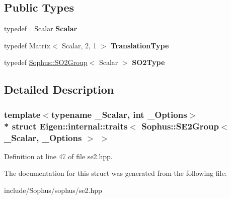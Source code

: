 \subsection*{Public Types}
\begin{DoxyCompactItemize}
\item 
typedef \+\_\+\+Scalar {\bfseries Scalar}\hypertarget{struct_eigen_1_1internal_1_1traits_3_01_sophus_1_1_s_e2_group_3_01___scalar_00_01___options_01_4_01_4_a664d628ffd6164ce7bdbd9ad95d90059}{}\label{struct_eigen_1_1internal_1_1traits_3_01_sophus_1_1_s_e2_group_3_01___scalar_00_01___options_01_4_01_4_a664d628ffd6164ce7bdbd9ad95d90059}

\item 
typedef Matrix$<$ Scalar, 2, 1 $>$ {\bfseries Translation\+Type}\hypertarget{struct_eigen_1_1internal_1_1traits_3_01_sophus_1_1_s_e2_group_3_01___scalar_00_01___options_01_4_01_4_af44e0fdd79fea705e426f4397a1b9412}{}\label{struct_eigen_1_1internal_1_1traits_3_01_sophus_1_1_s_e2_group_3_01___scalar_00_01___options_01_4_01_4_af44e0fdd79fea705e426f4397a1b9412}

\item 
typedef \hyperlink{class_sophus_1_1_s_o2_group}{Sophus\+::\+S\+O2\+Group}$<$ Scalar $>$ {\bfseries S\+O2\+Type}\hypertarget{struct_eigen_1_1internal_1_1traits_3_01_sophus_1_1_s_e2_group_3_01___scalar_00_01___options_01_4_01_4_a49cc921045132b2d1f69a20b48878245}{}\label{struct_eigen_1_1internal_1_1traits_3_01_sophus_1_1_s_e2_group_3_01___scalar_00_01___options_01_4_01_4_a49cc921045132b2d1f69a20b48878245}

\end{DoxyCompactItemize}


\subsection{Detailed Description}
\subsubsection*{template$<$typename \+\_\+\+Scalar, int \+\_\+\+Options$>$\\*
struct Eigen\+::internal\+::traits$<$ Sophus\+::\+S\+E2\+Group$<$ \+\_\+\+Scalar, \+\_\+\+Options $>$ $>$}



Definition at line 47 of file se2.\+hpp.



The documentation for this struct was generated from the following file\+:\begin{DoxyCompactItemize}
\item 
include/\+Sophus/sophus/se2.\+hpp\end{DoxyCompactItemize}
